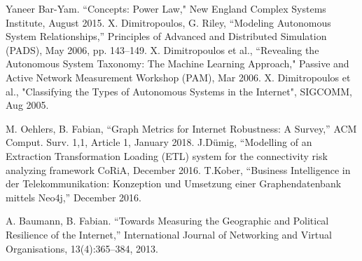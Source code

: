\documentclass[conference, 11pt]{IEEEtran}
\begin{document}
\begin{thebibliography}{00}



 

 Yaneer Bar-Yam. ``Concepts: Power Law," New England Complex Systems Institute, August 2015.
X. Dimitropoulos, G. Riley, ``Modeling Autonomous System Relationships,'' Principles of Advanced and Distributed Simulation (PADS), May 2006, pp. 143--149.
X. Dimitropoulos et al., ``Revealing the Autonomous System Taxonomy: The Machine Learning Approach," Passive and Active Network Measurement Workshop (PAM), Mar 2006.
X. Dimitropoulos et al., "Classifying the Types of Autonomous Systems in the Internet", SIGCOMM, Aug 2005.







M. Oehlers, B. Fabian, ``Graph Metrics for Internet Robustness: A Survey,'' ACM Comput. Surv. 1,1, Article 1, January 2018.
J.Dümig, ``Modelling of an Extraction Transformation Loading (ETL) system for the connectivity risk analyzing framework CoRiA, December 2016.
T.Kober, ``Business Intelligence in der Telekommunikation: Konzeption und Umsetzung einer Graphendatenbank mittels Neo4j,'' December 2016.

A. Baumann, B. Fabian. ``Towards Measuring the Geographic and Political Resilience of the Internet,'' International Journal of Networking and Virtual Organisations, 13(4):365–384, 2013.


\end{thebibliography}
\end{document}
